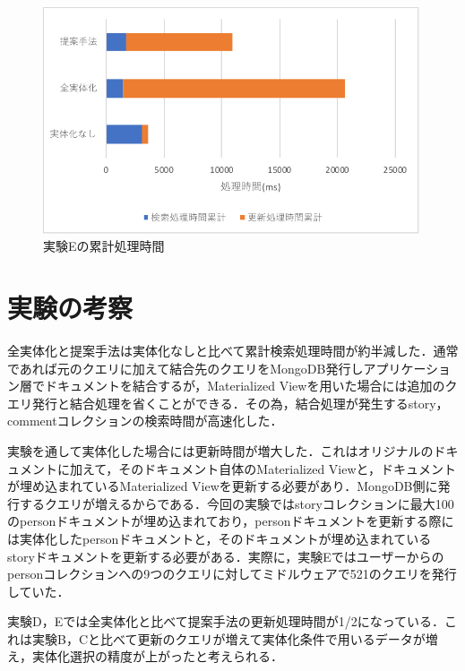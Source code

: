 \documentclass[a4paper,11pt]{ujreport}
\begin{document}
\begin{figure}[htbp]
	\begin{center}
		\includegraphics[width=30em]{src/ExperimentE-total.pdf} %
	\end{center}
	\caption{実験Eの累計処理時間}
	\label{ExperimentE-total}
\end{figure}

\section{実験の考察}
\label{sec:Consideration}
全実体化と提案手法は実体化なしと比べて累計検索処理時間が約半減した．通常であれば元のクエリに加えて結合先のクエリをMongoDB発行しアプリケーション層でドキュメントを結合するが，Materialized Viewを用いた場合には追加のクエリ発行と結合処理を省くことができる．その為，結合処理が発生するstory，commentコレクションの検索時間が高速化した．

実験を通して実体化した場合には更新時間が増大した．これはオリジナルのドキュメントに加えて，そのドキュメント自体のMaterialized Viewと，ドキュメントが埋め込まれているMaterialized Viewを更新する必要があり．MongoDB側に発行するクエリが増えるからである．今回の実験ではstoryコレクションに最大100のpersonドキュメントが埋め込まれており，personドキュメントを更新する際には実体化したpersonドキュメントと，そのドキュメントが埋め込まれているstoryドキュメントを更新する必要がある．実際に，実験Eではユーザーからのpersonコレクションへの9つのクエリに対してミドルウェアで521のクエリを発行していた．

実験D，Eでは全実体化と比べて提案手法の更新処理時間が1/2になっている．これは実験B，Cと比べて更新のクエリが増えて実体化条件で用いるデータが増え，実体化選択の精度が上がったと考えられる．
\end{document}
